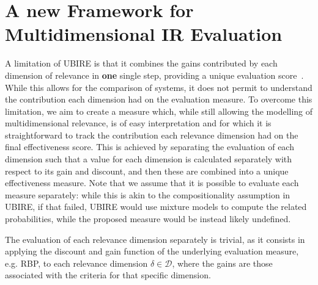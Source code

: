 
\section{A new Framework for Multidimensional IR Evaluation}
\label{sec:extension}

A limitation of UBIRE is that it combines the gains contributed by each dimension of relevance in \textbf{one} single step, providing a unique evaluation score~\cite{zuccon14,zuccon16}.
While this allows for the comparison of systems, it does not permit to understand the contribution each dimension had on the evaluation measure. 
To overcome this limitation, we aim to create a measure which, while still allowing the modelling of multidimensional relevance, is of easy interpretation and for which it is straightforward to track the contribution each relevance dimension had on the final effectiveness score. This is achieved by separating the evaluation of each dimension such that a value for each dimension is calculated separately with respect to its gain and discount, and then these are combined into a unique effectiveness measure. Note that we assume that it is possible to evaluate each measure separately: while this is akin to the compositionality assumption in UBIRE, if that failed, UBIRE would use mixture models to compute the related probabilities, while the proposed measure would be instead likely undefined. 

The evaluation of each relevance dimension separately is trivial, as it consists in applying the discount and gain function of the underlying evaluation measure, e.g. RBP, to each relevance dimension $\delta \in \mathcal{D}$, where the gains are those associated with the criteria for that specific dimension. 




